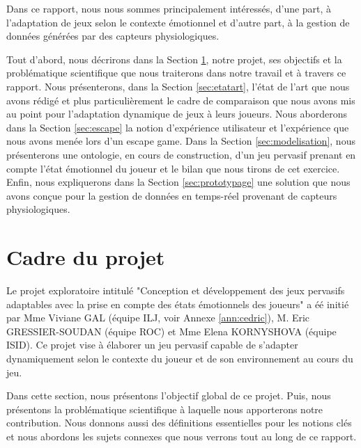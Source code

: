 \documentclass[11pt]{article}
\begin{document}
	Dans ce rapport, nous nous sommes principalement intéressés, d'une part, à l'adaptation de jeux selon le contexte émotionnel et d'autre part, à la gestion de données générées par des capteurs physiologiques.\par
	Tout d'abord, nous décrirons dans la Section \ref{sec:projet}, notre projet, ses objectifs et la problématique scientifique que nous traiterons dans notre travail et à travers ce rapport.
	Nous présenterons, dans la Section \ref{sec:etatart}, l'état de l'art que nous avons rédigé et plus particulièrement le cadre de comparaison que nous avons mis au point pour l'adaptation dynamique de jeux à leurs joueurs. 
	Nous aborderons dans la Section \ref{sec:escape} la notion d'expérience utilisateur et l'expérience que nous avons menée lors d'un escape game.
	Dans la Section \ref{sec:modelisation}, nous présenterons une ontologie, en cours de construction, d'un jeu pervasif prenant en compte l'état émotionnel du joueur et le bilan que nous tirons de cet exercice.
	Enfin, nous expliquerons dans la Section \ref{sec:prototypage} une solution que nous avons conçue pour la gestion de données en temps-réel provenant de capteurs physiologiques.

\section{Cadre du projet}\label{sec:projet}
	Le projet exploratoire intitulé "Conception et développement des jeux pervasifs adaptables avec la prise en compte des états émotionnels des joueurs" a éé initié par Mme Viviane GAL (équipe ILJ, voir Annexe \ref{ann:cedric}), M. Eric GRESSIER-SOUDAN (équipe ROC) et Mme Elena KORNYSHOVA (équipe ISID).
	Ce projet vise à élaborer un jeu pervasif capable de s'adapter dynamiquement selon le contexte du joueur et de son environnement au cours du jeu.\par
	Dans cette section, nous présentons l'objectif global de ce projet.
	Puis, nous présentons la problématique scientifique à laquelle nous apporterons notre contribution.
	Nous donnons aussi des définitions essentielles pour les notions clés et nous abordons les sujets connexes que nous verrons tout au long de ce rapport.
\end{document}
